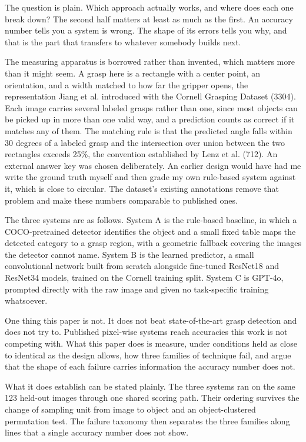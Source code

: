 \documentclass[12pt,letterpaper]{article}
\begin{document}
The question is plain. Which approach actually works, and where does
each one break down? The second half matters at least as much as the
first. An accuracy number tells you a system is wrong. The shape of its
errors tells you why, and that is the part that transfers to whatever
somebody builds next.

The measuring apparatus is borrowed rather than invented, which matters
more than it might seem. A grasp here is a rectangle with a center
point, an orientation, and a width matched to how far the gripper
opens, the representation Jiang et al. introduced with the Cornell
Grasping Dataset (3304). Each image carries several labeled grasps
rather than one, since most objects can be picked up in more than one
valid way, and a prediction counts as correct if it matches any of
them. The matching rule is that the predicted angle falls within 30
degrees of a labeled grasp and the intersection over union between the
two rectangles exceeds 25\%, the convention established by Lenz et al.
(712). An external answer key was chosen deliberately. An earlier
design would have had me write the ground truth myself and then grade
my own rule-based system against it, which is close to circular. The
dataset's existing annotations remove that problem and make these
numbers comparable to published ones.

The three systems are as follows. System A is the rule-based baseline,
in which a COCO-pretrained detector identifies the object and a small
fixed table maps the detected category to a grasp region, with a
geometric fallback covering the images the detector cannot name. System
B is the learned predictor, a small convolutional network built from
scratch alongside fine-tuned ResNet18 and ResNet34 models, trained on
the Cornell training split. System C is GPT-4o, prompted directly with
the raw image and given no task-specific training whatsoever.

One thing this paper is not. It does not beat state-of-the-art grasp
detection and does not try to. Published pixel-wise systems reach
accuracies this work is not competing with. What this paper does is
measure, under conditions held as close to identical as the design
allows, how three families of technique fail, and argue that the shape
of each failure carries information the accuracy number does not.

What it does establish can be stated plainly. The three systems ran on
the same 123 held-out images through one shared scoring path. Their
ordering survives the change of sampling unit from image to object and
an object-clustered permutation test. The failure taxonomy then
separates the three families along lines that a single accuracy number
does not show.
\end{document}

